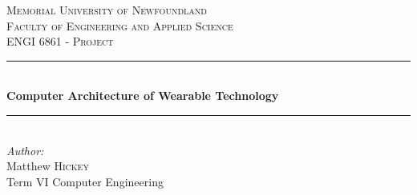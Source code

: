 \newcommand{\HRule}{\rule{\linewidth}{0.5mm}} %

\center %


\textsc{\LARGE Memorial University of Newfoundland}\\[1.5cm]
\textsc{\Large Faculty of Engineering and Applied Science}\\[0.5cm] %
\textsc{\large ENGI 6861 - Project}\\[0.5cm] %


\HRule \\[0.4cm]
{ \huge \bfseries Computer Architecture of Wearable Technology}\\[0.4cm] %
\HRule \\[1.5cm]


\Large \emph{Author:}\\
Matthew \textsc{Hickey}\\ %
Term VI Computer Engineering\\[2cm]


